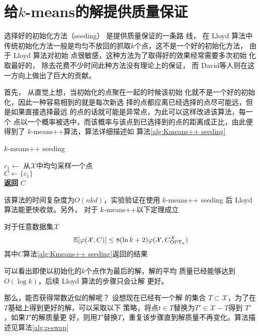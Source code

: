\section{给\texorpdfstring{$k$}{k}-means的解提供质量保证}

选择好的初始化方法（seeding） 是提供质量保证的一条路
线， 在 Lloyd 算法中传统初始化方法一般是均匀不放回的抓取$k$个点，这不是一个好的初始化方法， 由于 Lloyd 算法对初始
点很敏感，这种方法为了取得好的效果经常需要多次初始
化取最好的， 除去花费不少时间此种方法没有理论上的保证，
而 David等人则在这一方向上做出了巨大的贡献。

首先， 从直觉上想，当初始化的点聚在一起的时候该初始
化就不是一个好的初始化，因此一种容易相到的就是每次新选
择的点都应离已经选择的点尽可能远，但是如果直接选择最远
的点的话就可能是异常点，为此可以这样改进该算法，每一个
点以一个概率被选中，而该概率与该点到已选择到的点的距离成正比，由此便得到了 $k$-means++算法，算法详细描述如
算法\ref{alg:Kmeans++ seeding}

\begin{algorithm}
    \caption{$k$-means++ seeding}\label{alg:Kmeans++ seeding}
    $c_1 \gets $ 从$\mathcal{X}$中均匀采样一个点 \\
    $C \gets \{c_1\}$ \\
    \textbf{返回} $C$
\end{algorithm}
该算法的时间复杂度为$O(nkd)$，实验验证在使用 $k$-means++ seeding 后 Lloyd 算法能更快收敛。另外， 对于 $k$-means++以下定理成立
\begin{theorem}
    对于任意数据集$\mathcal{X}$
    \begin{equation*}
    \mathbb{E}[\varphi(\mathcal{X},C)] \leq 8(\ln k + 2) \varphi(\mathcal{X},C_{\text{OPT}_k}^{\mathcal{X}})
    \end{equation*}
    其中$C$算法\ref{alg:Kmeans++ seeding}返回的结果
\end{theorem}
可以看出即使以初始化的$k$个点作为最后的解，解的平均
质量已经能够达到$O(\log k)$，后续 Lloyd 算法的步骤只会让解
更好。

那么，能否获得常数近似的解呢？ 设想现在已经有一个解
的集合 $T \subset \mathcal{X}$，为了在$T$基础上得到更好的解，可以采取以下
策略，将点$t\in T$替换为$T' \in \mathcal{X}-T$得到 $T'$，如果$T'$的解质量更
好，则用$T'$替换$T$，重复该步骤直到解质量不再变化。算法描
述见算法\ref{alg:p-swap}

